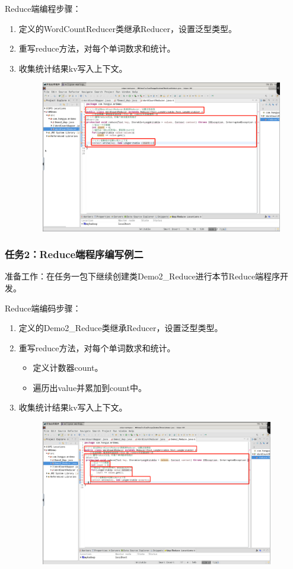 \documentclass {article}
\begin{document}
				Reduce端编程步骤：
				\begin{enumerate}
					\item 定义的WordCountReducer类继承Reducer，设置泛型类型。
					\item 重写reduce方法，对每个单词数求和统计。
					\item 收集统计结果kv写入上下文。
					\begin{figure}[H]
						\centering
						\includegraphics[width=4.5in]{figures/fig5.png}
					\end{figure}
				\end{enumerate}
			
			\subsubsection{任务2：Reduce端程序编写例二}
				准备工作：在任务一包下继续创建类Demo2\_Reduce进行本节Reduce端程序开发。
				
				Reduce端编码步骤：
				\begin{enumerate}
					\item 定义的Demo2\_Reduce类继承Reducer，设置泛型类型。
					\item 重写reduce方法，对每个单词数求和统计。
					\begin{itemize}
						\item 定义计数器count。
						\item 遍历出value并累加到count中。
					\end{itemize}
					\item 收集统计结果kv写入上下文。
					\begin{figure}[H]
						\centering
						\includegraphics[width=4in]{figures/fig6.png}
					\end{figure}
				\end{enumerate}
			
\end{document}
